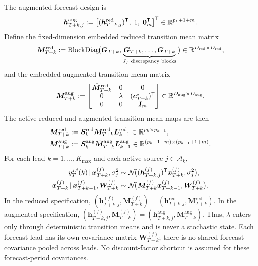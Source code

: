 The augmented forecast design is
\begin{align}
\bm h_{T+k,j}^{\mathrm{aug}}
:=
\left[(\bm h_{T+k,j}^{\mathrm{red}})^{\mathsf{T}},\;1,\;\bm 0_m^{\mathsf{T}}\right]^{\mathsf{T}}
\in \mathbb{R}^{p_k+1+m}.
\label{eq:C_h_aug}
\end{align}
Define the fixed-dimension embedded reduced transition mean matrix
\begin{align}
\bar{\bm M}_{T+k}^{\mathrm{red}}
:=
\mathrm{BlockDiag}\!\big(
\bm G_{T+k},
\underbrace{\bm G_{T+k},\dots,\bm G_{T+k}}_{J_f\text{ discrepancy blocks}}
\big)\in\mathbb{R}^{D_{\mathrm{red}}\times D_{\mathrm{red}}},
\label{eq:C_M_red_emb}
\end{align}
and the embedded augmented transition mean matrix
\begin{align}
\bar{\bm M}_{T+k}^{\mathrm{aug}}
:=
\begin{bmatrix}
\bar{\bm M}_{T+k}^{\mathrm{red}} & 0 & 0 \\
0 & \lambda & (\bm c_{T+k}^\star)^{\mathsf{T}} \\
0 & 0 & \bm I_m
\end{bmatrix}\in\mathbb{R}^{D_{\mathrm{aug}}\times D_{\mathrm{aug}}}.
\label{eq:C_M_aug_emb}
\end{align}
The active reduced and augmented transition mean maps are then
\begin{align}
\bm M_{T+k}^{\mathrm{red}}
&:= \bm S_k^{\mathrm{red}}\bar{\bm M}_{T+k}^{\mathrm{red}}\bm L_{k-1}^{\mathrm{red}}
\in \mathbb{R}^{p_k\times p_{k-1}}, \label{eq:C_M_red}\\
\bm M_{T+k}^{\mathrm{aug}}
&:= \bm S_k^{\mathrm{aug}}\bar{\bm M}_{T+k}^{\mathrm{aug}}\bm L_{k-1}^{\mathrm{aug}}
\in \mathbb{R}^{(p_k+1+m)\times(p_{k-1}+1+m)}. \label{eq:C_M_aug}
\end{align}
For each lead $k=1,\dots,K_{\max}$ and each active source $j\in\mathcal A_k$,
\begin{align}
 y_T^{j,i}(k) \,|\, \bm x_{T+k}^{(f)},\sigma_j^2
 &\sim \mathcal{N}\!\big((\bm h_{T+k,j}^{(f)})^{\mathsf{T}}\bm x_{T+k}^{(f)},\sigma_j^2\big), \label{eq:C_obs}\\
 \bm x_{T+k}^{(f)}\,|\,\bm x_{T+k-1}^{(f)},\bm W_{T+k}^{(f)}
 &\sim \mathcal{N}\!\big(\bm M_{T+k}^{(f)}\bm x_{T+k-1}^{(f)},\bm W_{T+k}^{(f)}\big). \label{eq:C_state}
\end{align}
In the reduced specification,
$(\bm h_{T+k,j}^{(f)},\bm M_{T+k}^{(f)})=(\bm h_{T+k,j}^{\mathrm{red}},\bm M_{T+k}^{\mathrm{red}})$.
In the augmented specification,
$(\bm h_{T+k,j}^{(f)},\bm M_{T+k}^{(f)})=(\bm h_{T+k,j}^{\mathrm{aug}},\bm M_{T+k}^{\mathrm{aug}})$.
Thus, $\lambda$ enters only through deterministic transition means and is never a stochastic state.
Each forecast lead has its own covariance matrix $\bm W_{T+k}^{(f)}$; there is no shared
forecast covariance pooled across leads. No discount-factor shortcut is assumed for these
forecast-period covariances.


